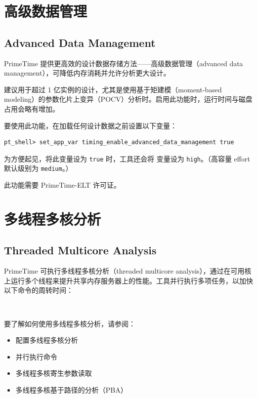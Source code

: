 \section{高级数据管理}
\subsection*{Advanced Data Management}

PrimeTime 提供更高效的设计数据存储方法——高级数据管理（advanced data management），可降低内存消耗并允许分析更大设计。

建议用于超过 1 亿实例的设计，尤其是使用基于矩建模（moment-based modeling）的参数化片上变异（POCV）分析时。启用此功能时，运行时间与磁盘占用会略有增加。

要使用此功能，在加载任何设计数据之前设置以下变量：
\begin{lstlisting}
pt_shell> set_app_var timing_enable_advanced_data_management true
\end{lstlisting}

为方便起见，将此变量设为 \texttt{true} 时，工具还会将  变量设为 \texttt{high}。（高容量 effort 默认级别为 \texttt{medium}。）

此功能需要 PrimeTime-ELT 许可证。

\section{多线程多核分析}
\subsection*{Threaded Multicore Analysis}

PrimeTime 可执行多线程多核分析（threaded multicore analysis），通过在可用核上运行多个线程来提升共享内存服务器上的性能。工具并行执行多项任务，以加快以下命令的周转时间：
\begin{center}
 \quad {} \quad {} \quad
{} \quad {} \quad {} \\
 \quad {} \quad {} \quad
{} \quad {}
\end{center}

要了解如何使用多线程多核分析，请参阅：
\begin{itemize}
  \item 配置多线程多核分析
  \item 并行执行命令
  \item 多线程多核寄生参数读取
  \item 多线程多核基于路径的分析（PBA）
\end{itemize}

